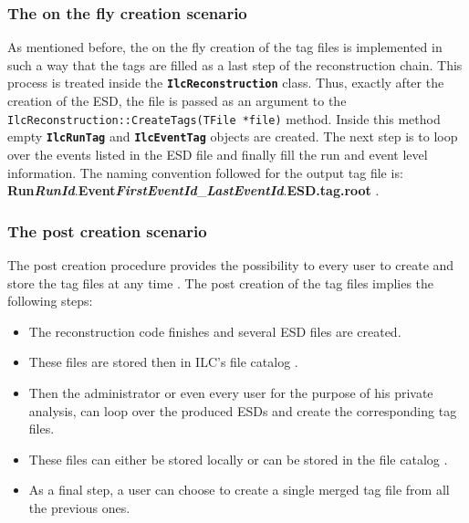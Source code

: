 \documentclass[12pt,a4paper,twoside]{article}
\newcommand{\class}[1]{\texttt{\textbf{#1}}\xspace}
\newcommand{\method}[1]{\texttt{#1}\xspace}
\begin{document}
{\begin{itemize}
\end{itemize}

\subsubsection{The on the fly creation scenario}

As mentioned before, the on the fly creation of the tag files is
implemented in such a way that the tags are filled as a last step of
the reconstruction chain. This process is treated inside the
\class{IlcReconstruction} class. Thus, exactly after the creation of
the ESD, the file is passed as an argument to the
\method{IlcReconstruction::CreateTags(TFile *file)} method. Inside
this method empty \class{IlcRunTag} and \class{IlcEventTag} objects
are created. The next step is to loop over the events listed in the
ESD file and finally fill the run and event level information. The
naming convention followed for the output tag file is:
\textbf{Run}\textbf{\textit{RunId}}.\textbf{Event}\textbf{\textit{FirstEventId}}\_\textbf{\textit{LastEventId}}.\textbf{ESD.tag.root}
\cite{EventTagWeb}. 

\subsubsection{The post creation scenario}

The post creation procedure provides the possibility to every user to
create and store the tag files at any time \cite{EventTagWeb}. The
post creation of the tag files implies the following steps: 

\begin{itemize}

\item The reconstruction code finishes and several ESD files are created. 

\item These files are stored then in ILC's file catalog \cite{AliEn}. 

\item Then the administrator or even every user for the purpose of his
  private analysis, can loop over the produced ESDs and create the
  corresponding tag files.

\item These files can either be stored locally or can be stored in the
  file catalog \cite{AliEn}.

\item As a final step, a user can choose to create a single merged tag
  file from all the previous ones.


\end{itemize}}
\end{document}
